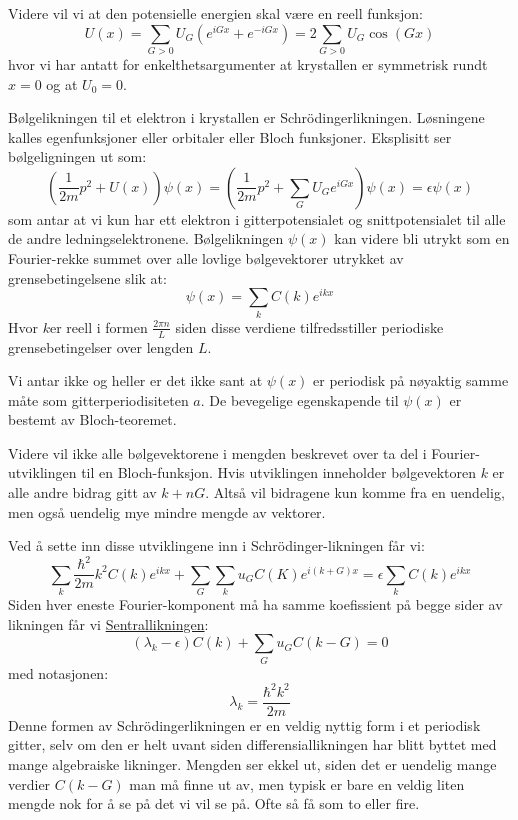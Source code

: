\documentclass{article}
\begin{document}
Videre vil vi at den potensielle energien skal være en reell funksjon:
\begin{equation}
    U(x) = \sum_{G>0} U_G \left(e^{iGx} + e^{-iGx}\right) = 2 \sum_{G>0} U_G \cos (Gx)
\end{equation}
hvor vi har antatt for enkelthetsargumenter at krystallen er symmetrisk rundt $x= 0$ og at $U_0 = 0$.

Bølgelikningen til et elektron i krystallen er Schrödingerlikningen. Løsningene kalles egenfunksjoner eller orbitaler eller Bloch funksjoner. Eksplisitt ser bølgeligningen ut som:
\begin{equation}
    \left(\frac{1}{2m}p^2 + U(x)\right)\psi(x) = \left(\frac{1}{2m}p^2 + \sum_G U_G e^{iGx}\right) \psi(x) = \epsilon \psi(x)
\end{equation}
som antar at vi kun har ett elektron i gitterpotensialet og snittpotensialet til alle de andre ledningselektronene. Bølgelikningen $\psi(x)$ kan videre bli utrykt som en Fourier-rekke summet over alle lovlige bølgevektorer utrykket av grensebetingelsene slik at:
\begin{equation}
    \psi(x) = \sum_k C(k) e^{ikx}
\end{equation}
Hvor $k$er reell i formen $\frac{2\pi n}{L}$ siden disse verdiene tilfredsstiller periodiske grensebetingelser over lengden $L$.

Vi antar ikke og heller er det ikke sant at $\psi(x)$ er periodisk på nøyaktig samme måte som gitterperiodisiteten $a$. De bevegelige egenskapende til $\psi(x)$ er bestemt av Bloch-teoremet.

Videre vil ikke alle bølgevektorene i mengden beskrevet over ta del i Fourier-utviklingen til en Bloch-funksjon. Hvis utviklingen inneholder bølgevektoren $k$ er alle andre bidrag gitt av $k + nG$. Altså vil bidragene  kun komme fra en uendelig, men også uendelig mye mindre mengde av vektorer.

Ved å sette inn disse utviklingene inn i Schrödinger-likningen får vi:
\begin{equation}
    \sum_k \frac{\hbar^2}{2m} k^2 C(k) e^{ikx} + \sum_G \sum_k u_G C(K) e^{i(k+G)x} = \epsilon \sum_k C(k) e^{ikx}
\end{equation}
Siden hver eneste Fourier-komponent må ha samme koefissient på begge sider av likningen får vi \underline{Sentrallikningen}:
\begin{equation}
    \boxed{(\lambda_k - \epsilon)C(k) + \sum_G u_G C(k-G) = 0}
\end{equation}
med notasjonen:
\begin{equation}
    \lambda_k = \frac{\hbar^2 k^2}{2m}
\end{equation}
Denne formen av Schrödingerlikningen er en veldig nyttig form i et periodisk gitter, selv om den er helt uvant siden differensiallikningen har blitt byttet med mange algebraiske likninger. Mengden ser ekkel ut, siden det er uendelig mange verdier $C(k-G)$ man må finne ut av, men typisk er bare en veldig liten mengde nok for å se på det vi vil se på. Ofte så få som to eller fire.
\end{document}
